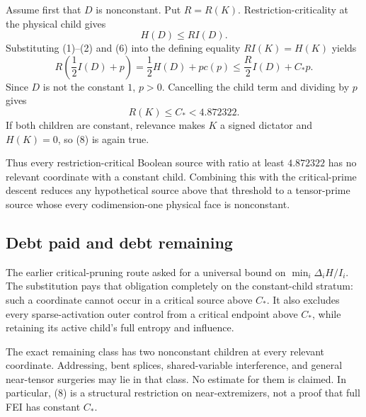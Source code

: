 Assume first that $D$ is nonconstant.  Put $R=R(K)$.  Restriction-criticality
at the physical child gives
\[
 H(D)\le R I(D).                                             \tag{6}
\]
Substituting (1)--(2) and (6) into the defining equality
$R I(K)=H(K)$ yields
\[
 R\left(\frac12 I(D)+p\right)
 =\frac12H(D)+pc(p)
 \le \frac R2 I(D)+C_*p.                                    \tag{7}
\]
Since $D$ is not the constant $1$, $p>0$.  Cancelling the child term and
dividing by $p$ gives
\[
 \boxed{R(K)\le C_*<4.872322.}                              \tag{8}
\]
If both children are constant, relevance makes $K$ a signed dictator and
$H(K)=0$, so (8) is again true.

Thus every restriction-critical Boolean source with ratio at least
$4.872322$ has no relevant coordinate with a constant child.  Combining this
with the critical-prime descent reduces any hypothetical source above that
threshold to a tensor-prime source whose every codimension-one physical face
is nonconstant.

\subsection*{Debt paid and debt remaining}

The earlier critical-pruning route asked for a universal bound on
$\min_i\Delta_iH/I_i$.  The substitution pays that obligation completely on
the constant-child stratum: such a coordinate cannot occur in a critical
source above $C_*$.  It also excludes every sparse-activation outer control
from a critical endpoint above $C_*$, while retaining its active child's full
entropy and influence.

The exact remaining class has two nonconstant children at every relevant
coordinate.  Addressing, bent splices, shared-variable interference, and
general near-tensor surgeries may lie in that class.  No estimate for them is
claimed.  In particular, (8) is a structural restriction on near-extremizers,
not a proof that full FEI has constant $C_*$.

